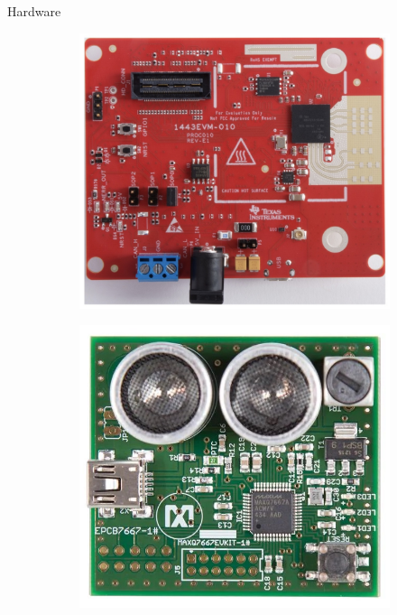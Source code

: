 \documentclass[dvipsnames, handout]{beamer}
\newcommand{\1}{\mathds{1}}	%
\begin{document}
\begin{frame}[t]{Hardware}
\begin{figure}[ht]
\begin{subfigure}[b]{0.4\textwidth}
\includegraphics[width=\textwidth]{imgs/iwr1443boost.jpg}
\end{subfigure}
\begin{subfigure}[b]{0.4\textwidth}
\includegraphics[width=\textwidth]{imgs/maxq7667evkit.jpg}
\end{subfigure}
\end{figure}


\end{frame}
\end{document}
